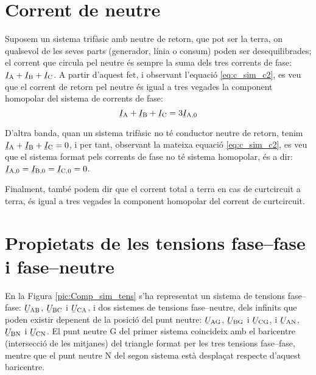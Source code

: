 \section{Corrent de neutre}\label{sec:corrent-neutre}

Suposem un sistema trifàsic amb neutre de retorn, que pot ser la
terra, on qualsevol de les seves parts (generador, línia o consum)
poden ser desequilibrades; el corrent que circula pel neutre és
sempre la suma dels tres corrents de fase: $\cmplx{I}\ped{A}+
\cmplx{I}\ped{B}+\cmplx{I}\ped{C}$. A partir d'aquest fet, i
observant l'equació \eqref{eq:c_sim_c2}, es veu que el corrent de
retorn pel neutre és igual a tres vegades la component homopolar
del sistema de corrents de fase:
\begin{equation}
    \cmplx{I}\ped{A}+\cmplx{I}\ped{B}+\cmplx{I}\ped{C} =3 \cmplx{I}\ped{A,0}
\end{equation}

D'altra banda, quan un sistema trifàsic no té conductor neutre de retorn, tenim
$\cmplx{I}\ped{A}+ \cmplx{I}\ped{B}+\cmplx{I}\ped{C}=0$, i per tant,
observant la mateixa equació \eqref{eq:c_sim_c2}, es veu que el
sistema format pels corrents de fase no té sistema homopolar, és a dir: $\cmplx{I}\ped{A,0}=\cmplx{I}\ped{B,0}=\cmplx{I}\ped{C,0}=0$.

Finalment, també podem dir que el corrent total a terra en cas de
curtcircuit a terra, és igual a tres vegades la component homopolar del
corrent de curtcircuit.

\section{Propietats de les tensions fase--fase i fase--neutre}\label{sec:comp-sim-neutre}
 

En la Figura \vref{pic:Comp_sim_tens} s'ha representat un sistema de
tensions fase--fase: $\cmplx{U}\ped{AB}$,
$\cmplx{U}\ped{BC}$ i $\cmplx{U}\ped{CA}$, i dos
sistemes de tensions fase--neutre, dels infinits que poden existir
depenent de la posició del punt neutre: $\cmplx{U}\ped{AG}$,
$\cmplx{U}\ped{BG}$ i $\cmplx{U}\ped{CG}$, i
$\cmplx{U}\ped{AN}$, $\cmplx{U}\ped{BN}$ i
$\cmplx{U}\ped{CN}$. El punt neutre G del primer sistema
coincideix amb el baricentre (intersecció de les mitjanes) del
triangle  format per les tres tensions fase--fase, mentre que el
punt neutre N del segon sistema està desplaçat respecte
d'aquest baricentre.

